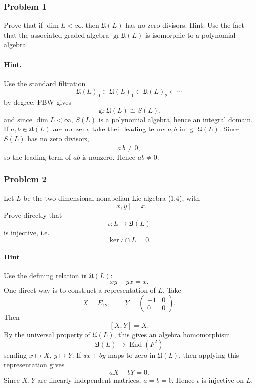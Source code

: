 \documentclass[12pt, a4paper]{article}
\begin{document}
\subsubsection{Problem 1}

Prove that if \(\dim L<\infty\), then \(\mathfrak U(L)\) has no zero divisors.
Hint: Use the fact that the associated graded algebra
\(\operatorname{gr}\mathfrak U(L)\) is isomorphic to a polynomial algebra.

\paragraph{Hint.}
Use the standard filtration
\[
\mathfrak U(L)_0\subset \mathfrak U(L)_1\subset \mathfrak U(L)_2\subset\cdots
\]
by degree. PBW gives
\[
\operatorname{gr}\mathfrak U(L)\cong S(L),
\]
and since \(\dim L<\infty\), \(S(L)\) is a polynomial algebra, hence an
integral domain. If \(a,b\in \mathfrak U(L)\) are nonzero, take their leading
terms \(\overline a,\overline b\) in \(\operatorname{gr}\mathfrak U(L)\). Since
\(S(L)\) has no zero divisors,
\[
\overline a\,\overline b\neq 0,
\]
so the leading term of \(ab\) is nonzero. Hence \(ab\neq 0\).

\subsubsection{Problem 2}

Let \(L\) be the two dimensional nonabelian Lie algebra (1.4), with
\[
[x,y]=x.
\]
Prove directly that
\[
\iota:L\to \mathfrak U(L)
\]
is injective, i.e.
\[
\ker\iota\cap L=0.
\]

\paragraph{Hint.}
Use the defining relation in \(\mathfrak U(L)\):
\[
xy-yx=x.
\]
One direct way is to construct a representation of \(L\). Take
\[
X=E_{12},\qquad
Y=
\begin{pmatrix}
-1&0\\
0&0
\end{pmatrix}.
\]
Then
\[
[X,Y]=X.
\]
By the universal property of \(\mathfrak U(L)\), this gives an algebra
homomorphism
\[
\mathfrak U(L)\to \operatorname{End}(F^2)
\]
sending \(x\mapsto X\), \(y\mapsto Y\). If \(ax+by\) maps to zero in
\(\mathfrak U(L)\), then applying this representation gives
\[
aX+bY=0.
\]
Since \(X,Y\) are linearly independent matrices, \(a=b=0\). Hence
\(\iota\) is injective on \(L\).
\end{document}
